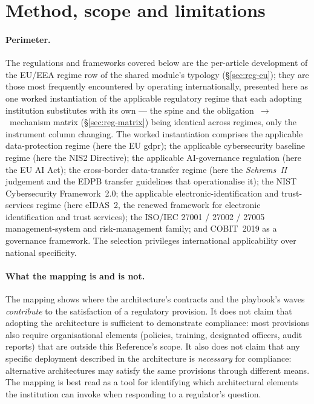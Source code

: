 \section{Method, scope and limitations}
\label{sec:rm-method}

\paragraph{Perimeter.} The regulations and frameworks covered below
are the per-article development of the EU/EEA regime row of the shared
module's typology (\S\ref{sec:reg-eu}); they are those most frequently
encountered by  operating
internationally, presented here as one worked instantiation of the
applicable regulatory regime that each adopting institution substitutes
with its own --- the spine and the obligation~$\rightarrow$~mechanism
matrix (\S\ref{sec:reg-matrix}) being identical across regimes, only the
instrument column changing. The worked
instantiation comprises the applicable data-protection regime
(here the EU \gls{gdpr}); the applicable cybersecurity baseline
regime (here the NIS2 Directive); the applicable AI-governance
regulation (here the EU AI Act); the cross-border data-transfer
regime (here the \emph{Schrems~II} judgement and the EDPB transfer
guidelines that operationalise it); the NIST Cybersecurity
Framework~2.0; the applicable electronic-identification and
trust-services regime (here eIDAS~2, the renewed framework for
electronic identification and trust services); the ISO/IEC 27001 /
27002 / 27005 management-system and risk-management family; and
COBIT~2019 as a governance framework. The selection privileges
international applicability over national specificity.

\paragraph{What the mapping is and is not.} The mapping shows
where the architecture's contracts and the playbook's waves
\emph{contribute} to the satisfaction of a regulatory provision.
It does not claim that adopting the architecture is sufficient to
demonstrate compliance: most provisions also require organisational
elements (policies, training, designated officers, audit reports)
that are outside this Reference's scope. It also does not claim
that any specific deployment described in the architecture is
\emph{necessary} for compliance: alternative architectures may
satisfy the same provisions through different means. The mapping
is best read as a tool for identifying which architectural elements
the institution can invoke when responding to a regulator's
question.

